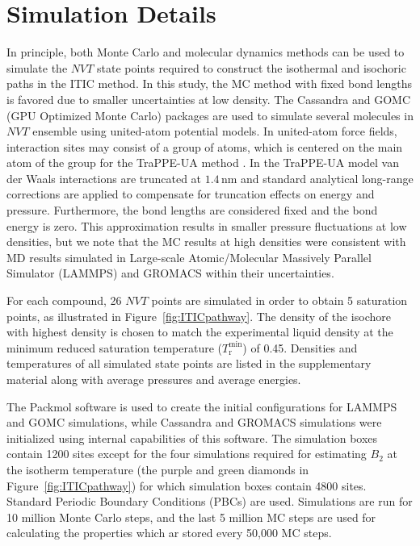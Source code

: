 \documentclass[5p,times]{elsarticle}
\begin{document}
\section{Simulation Details} \label{sec:SimDetail}
In principle, both Monte Carlo and molecular dynamics methods can be used to simulate the $NVT$ state points required to construct the isothermal and isochoric paths in the ITIC method. In this study, the MC method with fixed bond lengths is favored due to smaller uncertainties at low density. The Cassandra \cite{Shah2017} and GOMC (GPU Optimized Monte Carlo) \cite{Mick2013} packages are used to simulate several molecules in $NVT$ ensemble using united-atom potential models. In united-atom force fields, interaction sites may consist of a group of atoms, which is centered on the main atom of the group for the TraPPE-UA method \cite{Smit1998}. In the TraPPE-UA model van der Waals interactions are truncated at $1.4\,\mathrm{nm}$ and standard analytical long-range corrections are applied to compensate for truncation effects on energy and pressure\cite{allen2017}. Furthermore, the bond lengths are considered fixed and the bond energy is zero. This approximation results in smaller pressure fluctuations at low densities, but we note that the MC results at high densities were consistent with MD results simulated in Large-scale Atomic/Molecular Massively Parallel Simulator (LAMMPS) \cite{Plimpton2007} and GROMACS \cite{Lindahl2001} within their uncertainties.

For each compound, 26 $NVT$ points are simulated in order to obtain 5 saturation points, as illustrated in Figure~\ref{fig:ITICpathway}. The density of the isochore with highest density is chosen to match the experimental liquid density at the minimum reduced saturation temperature ($T_\mathrm{r}^\mathrm{min}$) of 0.45. Densities and temperatures of all simulated state points are listed in the supplementary material along with average pressures and average energies.

The Packmol \cite{martinez2009packmol} software is used to create the initial configurations for LAMMPS and GOMC simulations, while Cassandra and GROMACS simulations were initialized using internal capabilities of this software. The simulation boxes contain 1200 sites except for the four simulations required for estimating $B_2$ at the isotherm temperature (the purple and green diamonds in Figure~\ref{fig:ITICpathway}) for which simulation boxes contain 4800 sites. Standard Periodic Boundary Conditions (PBCs) are used. Simulations are run for 10 million Monte Carlo steps, and the last 5 million MC steps are used for calculating the properties which ar stored every 50,000 MC steps. 
\end{document}
